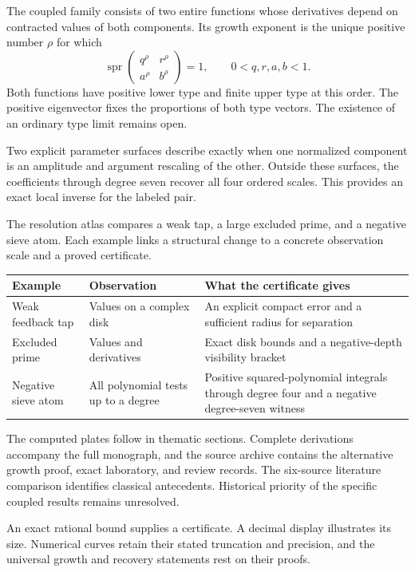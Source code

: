 The coupled family consists of two entire functions whose derivatives depend on
contracted values of both components. Its growth exponent is the unique
positive number $\rho$ for which
\[
\operatorname{spr}\begin{pmatrix}q^\rho&r^\rho\\a^\rho&b^\rho\end{pmatrix}=1,
\qquad 0<q,r,a,b<1.
\]
Both functions have positive lower type and finite upper type at this order.
The positive eigenvector fixes the proportions of both type vectors. The
existence of an ordinary type limit remains open.

Two explicit parameter surfaces describe exactly when one normalized component
is an amplitude and argument rescaling of the other. Outside these surfaces,
the coefficients through degree seven recover all four ordered scales. This
provides an exact local inverse for the labeled pair.

The resolution atlas compares a weak tap, a large excluded prime, and a negative
sieve atom. Each example links a structural change to a concrete observation
scale and a proved certificate.
\begin{center}
\renewcommand{\arraystretch}{1.35}
\begin{tabular}{@{}>{\raggedright\arraybackslash}p{.22\linewidth}>{\raggedright\arraybackslash}p{.31\linewidth}>{\raggedright\arraybackslash}p{.39\linewidth}@{}}
\toprule
Example & Observation & What the certificate gives\\\midrule
Weak feedback tap & Values on a complex disk & An explicit compact error and a sufficient radius for separation\\
Excluded prime & Values and derivatives & Exact disk bounds and a negative-depth visibility bracket\\
Negative sieve atom & All polynomial tests up to a degree & Positive squared-polynomial integrals through degree four and a negative degree-seven witness\\
\bottomrule
\end{tabular}
\end{center}

The computed plates follow in thematic sections.
Complete derivations accompany the full monograph, and the source archive
contains the alternative growth proof, exact laboratory, and review records.
The six-source literature comparison identifies classical antecedents.
Historical priority of the specific coupled results remains unresolved.

An exact rational bound supplies a certificate. A decimal display illustrates
its size. Numerical curves retain their stated truncation and precision, and
the universal growth and recovery statements rest on their proofs.
